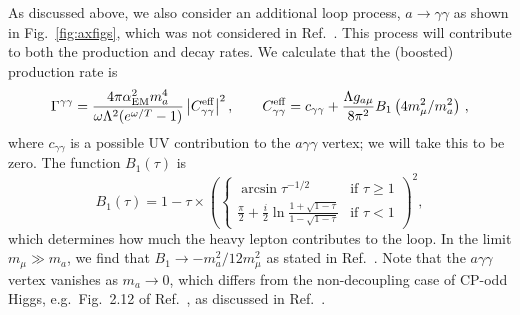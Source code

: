 \documentclass[11pt]{article}
\newcommand{\pL}{\left(} \newcommand{\pR}{\right)} \newcommand{\bL}{\left[} \newcommand{\bR}{\right]} \newcommand{\cbL}{\left\{} \newcommand{\cbR}{\right\}} \newcommand{\mL}{\left|} \newcommand{\mR}{\right|}
\begin{document}
As discussed above, we also consider an additional loop process, $a \to \gamma \gamma$ as shown in Fig.~\ref{fig:axfigs}, which was not considered in Ref.~\cite{Bollig:2020xdr}. This process will contribute to both the production and decay rates.
We calculate that the (boosted) production rate is
\begin{equation}
\Gamma^{\gamma \gamma} = \frac{4\pi \alpha_{\rm EM}^2 m_a^4}{\omega \Lambda^2  (e^{\omega/T} - 1 )} \mL C_{\gamma \gamma}^{\rm eff} \mR^2, \qquad C_{\gamma \gamma}^{\rm eff} = c_{\gamma \gamma} + \frac{\Lambda g_{a\mu}}{8\pi^2} B_1\left(4m_\mu^2/m_a^2\right) \,,
    \label{diphoton-decay-rate-1}
\end{equation}
where $c_{\gamma \gamma}$ is a possible UV contribution to the $a \gamma \gamma$ vertex; we will take this to be zero. The function $B_1(\tau)$ is
\begin{equation}
 B_1(\tau) = 1- \tau \times  \pL \begin{cases}   \arcsin \tau^{-1/2}  & \mbox{if } \tau \geq 1 \\   \frac\pi2+ \frac i2 \ln \frac{1+\sqrt{1-\tau}}{1-\sqrt{1-\tau}}  & \mbox{if } \tau < 1 \end{cases} \pR^2,
\end{equation}
which determines how much the heavy lepton contributes to the  loop.
In the limit $m_\mu \gg m_a$, we find that $B_1 \to -m_a^2/12m_\mu^2$ as stated in Ref.~\cite{Bauer:2017ris}. Note that the $a \gamma \gamma$ vertex vanishes as $m_a \to 0$, which differs from the non-decoupling case of CP-odd Higgs, e.g.~Fig.~2.12 of Ref.~\cite{Djouadi:2005gj}, as discussed in  Ref.~\cite{Bauer:2017ris}. 
\end{document}
